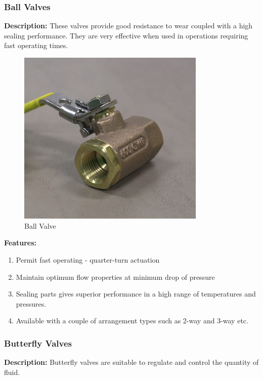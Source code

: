 \subsubsection{Ball Valves}
\textbf{Description:} These valves provide good resistance to wear coupled with a high sealing performance. They are very effective when used in operations requiring fast operating times.

\begin{figure}[h]
    \centering
    \includegraphics[width=0.8\textwidth,height=0.33\textheight,keepaspectratio]{figs/valves/ball.png}
    \caption{Ball Valve}
    \label{fig:ball_valve}
\end{figure}

\textbf{Features:}
\begin{enumerate}
    \item Permit fast operating - quarter-turn actuation
    \item Maintain optimum flow properties at minimum drop of pressure
    \item Sealing parts gives superior performance in a high range of temperatures and pressures.
    \item Available with a couple of arrangement types such as 2-way and 3-way etc.
\end{enumerate}

\subsubsection{Butterfly Valves}
\textbf{Description:} Butterfly valves are suitable to regulate and control the quantity of fluid.

